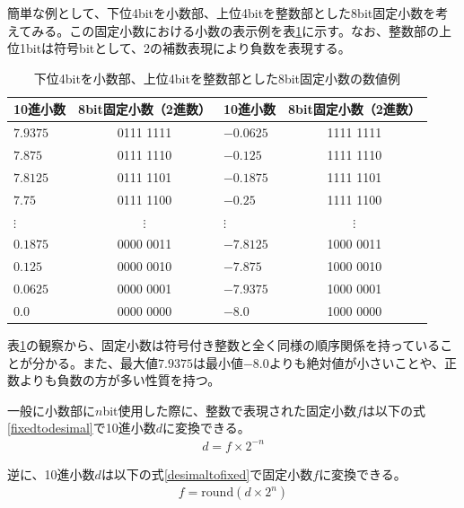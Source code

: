 \documentclass[uplatex,dvipdfmx,b5j,10pt]{jsbook}
\theoremstyle{definition}
\begin{document}
簡単な例として、下位4bitを小数部、上位4bitを整数部とした8bit固定小数を考えてみる。この固定小数における小数の表示例を表\ref{fixedfloat8x8}に示す。なお、整数部の上位1bitは符号bitとして、2の補数表現により負数を表現する。
\begin{table}[htbp]
  \begin{center}
    \caption{下位4bitを小数部、上位4bitを整数部とした8bit固定小数の数値例} \label{fixedfloat8x8}
    \begin{tabular}{|l|c||l|c|}
      \hline
      10進小数 & 8bit固定小数（2進数）& 10進小数  & 8bit固定小数（2進数） \\ \hline
      $7.9375$ & 0111 1111            & $-0.0625$ & 1111 1111             \\ \hline
      $7.875$  & 0111 1110            & $-0.125$  & 1111 1110             \\ \hline
      $7.8125$ & 0111 1101            & $-0.1875$ & 1111 1101             \\ \hline
      $7.75$   & 0111 1100            & $-0.25$   & 1111 1100             \\ \hline
      $\vdots$ & $\vdots$             & $\vdots$  & $\vdots$              \\ \hline
      $0.1875$ & 0000 0011            & $-7.8125$ & 1000 0011             \\ \hline
      $0.125$  & 0000 0010            & $-7.875$  & 1000 0010             \\ \hline
      $0.0625$ & 0000 0001            & $-7.9375$ & 1000 0001             \\ \hline
      $0.0$    & 0000 0000            & $-8.0$    & 1000 0000             \\ \hline
    \end{tabular}
  \end{center}
\end{table}

表\ref{fixedfloat8x8}の観察から、固定小数は符号付き整数と全く同様の順序関係を持っていることが分かる。また、最大値$7.9375$は最小値$-8.0$よりも絶対値が小さいことや、正数よりも負数の方が多い性質を持つ。

一般に小数部に$n$bit使用した際に、整数で表現された固定小数$f$は以下の式\ref{fixedtodesimal}で10進小数$d$に変換できる。
\begin{eqnarray}
  d = f \times 2^{-n} \label{fixedtodesimal}
\end{eqnarray}

逆に、10進小数$d$は以下の式\ref{desimaltofixed}で固定小数$f$に変換できる。
\begin{eqnarray}
  f = \textrm{round}(d \times 2^{n}) \label{desimaltofixed}
\end{eqnarray}
\end{document}
